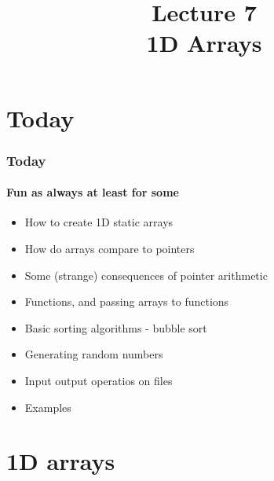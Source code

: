 \documentclass[10pt]{beamer}
\title{Lecture 7\\1D Arrays}
\date{}
\begin{document}
\frame{
    \titlepage
}

\section{Today}
\begin{frame}
  \frametitle{Today}
  \framesubtitle{Fun as always {\tiny at least for some}}
  \begin{itemize}
    \item How to create 1D static arrays
    \item How do arrays compare to pointers
    \item Some (strange) consequences of pointer arithmetic
    \item Functions, and passing arrays to functions
    \item Basic sorting algorithms - bubble sort
    \item Generating random numbers
    \item Input output operatios on files
    \item Examples
  \end{itemize}
\end{frame}

\section{1D arrays}
\end{document}
